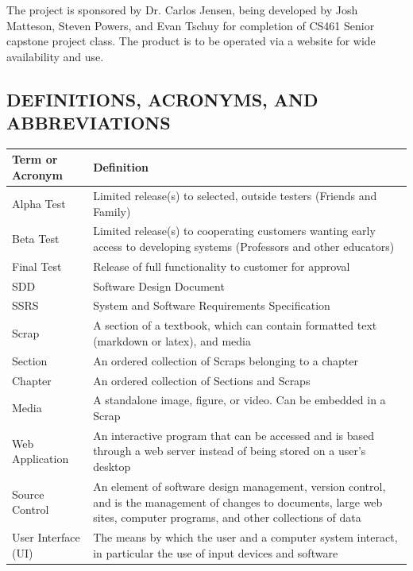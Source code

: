 \documentclass[letterpaper, 10pt, draftclsnofoot, compsoc, onecolumn]{IEEEtran}
\begin{document}
{\noindent 
The project is sponsored by Dr. Carlos Jensen, being developed by Josh Matteson,
Steven Powers, and Evan Tschuy for completion of CS461 Senior capstone project class.
The product is to be operated via a website for wide availability and use.}

\subsection[DEFINITIONS, ACRONYMS, AND ABBREVIATIONS]{\rmfamily\bfseries\color{black} DEFINITIONS, ACRONYMS, AND ABBREVIATIONS}

\bigskip

\begin{center}

\tablehead{}
\begin{supertabular}{|p{3cm}|p{12cm}|}
\hline
Term or Acronym & Definition\\\hline
Alpha Test & Limited release(s) to selected, outside testers (Friends and Family)\\ \hline
Beta Test & Limited release(s) to cooperating customers wanting early access to developing systems (Professors 
and other educators)\\ \hline
Final Test & Release of full functionality to customer for approval \\ \hline
SDD & Software Design Document \\ \hline
SSRS & System and Software Requirements Specification \\ \hline
Scrap & A section of a textbook, which can contain formatted text (markdown or latex), and media \\ \hline
Section & An ordered collection of Scraps belonging to a chapter\\ \hline
Chapter & An ordered collection of Sections and Scraps\\ \hline
Media & A standalone image, figure, or video. Can be embedded in a Scrap\\ \hline
Web Application & An interactive program that can be accessed and is based through a web server instead of 
being stored on a user's desktop\\ \hline
Source Control & An element of software design management, version control, and is the 
management of changes to documents, large web sites, computer programs, and other 
collections of data \\ \hline
User Interface (UI)  & The means by which the user and a computer system interact, in particular the use of 
input devices and software\\ \hline
\end{supertabular}

\end{center}
\end{document}
